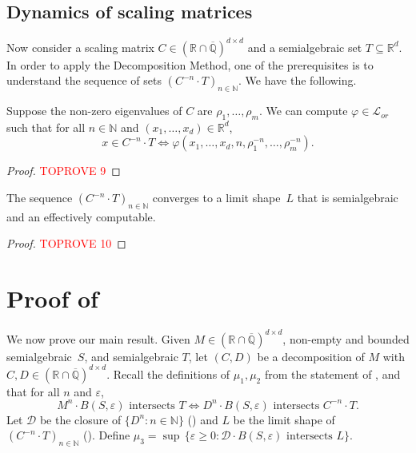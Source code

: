 \documentclass[a4paper,UKenglish,cleveref]{lipics-v2021}
\newcommand{\nat}{\mathbb{N}}
\newcommand{\rel}{\mathbb{R}}
\newcommand{\rat}{\mathbb{Q}}
\newcommand{\alg}{\overline{\rat}}
\newcommand{\ralg}{\rel \cap \alg}
\newcommand{\Dcal}{\mathcal{D}}
\newcommand{\Lcal}{\mathcal{L}}
\begin{document}
\subsection{Dynamics of scaling matrices}
\label{sec:scaling-dynamics}

Now consider a scaling matrix $C \in (\ralg)^{d \times d}$ and a semialgebraic set $T \subseteq \rel^d$.
In order to apply the Decomposition Method, one of the prerequisites is to understand the sequence of sets $(C^{-n} \cdot T)_{n \in \nat}$.
We have the following.
\begin{lemma}
	\label{thm:defining-Zn}
	Suppose the non-zero eigenvalues of $C$ are $\rho_1,\ldots,\rho_m$.
	We can compute $\varphi \in\Lcal_{or}$ such that for all $n\in\nat $ and $(x_1,\ldots,x_d) \in \rel^d$,
	\[
	x \in C^{-n}\cdot T \Leftrightarrow \varphi(x_1,\ldots,x_d, n, \rho_1^{-n}, \ldots,  \rho_m^{-n}).
	\]
\end{lemma}
\begin{proof}\textcolor{red}{TOPROVE 9}\end{proof}

\begin{lemma}
	\label{thm:scaling-matrices-lim-shape}
	The sequence $(C^{-n} \cdot T)_{n \in \nat}$ converges to a limit shape~$L$ that is semialgebraic and an effectively computable.
\end{lemma}
\begin{proof}\textcolor{red}{TOPROVE 10}\end{proof}

\section{Proof of \texorpdfstring{}{Theorem 1}}

We now prove our main result.
Given $M \in (\ralg)^{d\times d}$, non-empty and bounded semialgebraic~$S$, and semialgebraic $T$, let $(C,D)$ be a decomposition of $M$ with $C,D \in (\ralg)^{d\times d}$.
Recall the definitions of $\mu_1,\mu_2$ from the statement of , and that for all $n$ and $\varepsilon$, 
\[
M^n \cdot B(S, \varepsilon) \textrm{ intersects $T$} \Leftrightarrow D^n \cdot B(S, \varepsilon) \textrm{ intersects } C^{-n} \cdot T. 
\]
Let $\Dcal$ be the closure of $\{D^n \colon n \in \nat\}$ () and $L$ be the limit shape of $(C^{-n}\cdot T)_{n\in\nat}$ ().
Define $\mu_3 = \sup \, \{\varepsilon \ge 0 \colon \Dcal \cdot B(S,\varepsilon) \textrm{ intersects $L$}\}$.
\end{document}

